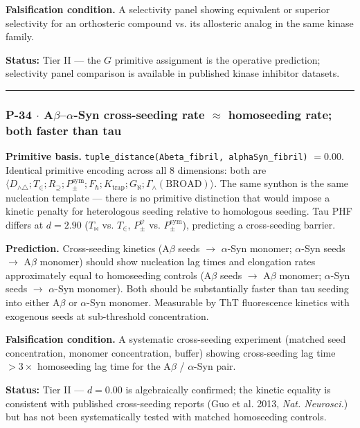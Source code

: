 \documentclass[12pt,a4paper]{article}
\begin{document}
\textbf{Falsification condition.} A selectivity panel showing equivalent or superior selectivity for an orthosteric compound vs. its allosteric analog in the same kinase family.

\textbf{Status:} Tier II --- the $G$ primitive assignment is the operative prediction; selectivity panel comparison is available in published kinase inhibitor datasets.

\begin{center}
\rule{0.5\textwidth}{0.4pt}
\end{center}

\subsubsection{P-34 $\cdot$ A$\beta$--$\alpha$-Syn cross-seeding rate $\approx$ homoseeding rate; both faster than tau}

\textbf{Primitive basis.} \texttt{tuple\_distance(Abeta\_fibril, alphaSyn\_fibril)} $= 0.00$. Identical primitive encoding across all 8 dimensions: both are $\langle D_{\wedge\triangle}; T_\in; R_\supseteq; P_\pm^\text{sym}; F_\hbar; K_\text{trap}; G_\aleph; \Gamma_\wedge(\text{BROAD})\rangle$. The same synthon is the same nucleation template --- there is no primitive distinction that would impose a kinetic penalty for heterologous seeding relative to homologous seeding. Tau PHF differs at $d = 2.90$ ($T_\bowtie$ vs. $T_\in$, $P_\pm^\psi$ vs. $P_\pm^\text{sym}$), predicting a cross-seeding barrier.

\textbf{Prediction.} Cross-seeding kinetics (A$\beta$ seeds $\rightarrow$ $\alpha$-Syn monomer; $\alpha$-Syn seeds $\rightarrow$ A$\beta$ monomer) should show nucleation lag times and elongation rates approximately equal to homoseeding controls (A$\beta$ seeds $\rightarrow$ A$\beta$ monomer; $\alpha$-Syn seeds $\rightarrow$ $\alpha$-Syn monomer). Both should be substantially faster than tau seeding into either A$\beta$ or $\alpha$-Syn monomer. Measurable by ThT fluorescence kinetics with exogenous seeds at sub-threshold concentration.

\textbf{Falsification condition.} A systematic cross-seeding experiment (matched seed concentration, monomer concentration, buffer) showing cross-seeding lag time $> 3\times$ homoseeding lag time for the A$\beta$ / $\alpha$-Syn pair.

\textbf{Status:} Tier II --- $d = 0.00$ is algebraically confirmed; the kinetic equality is consistent with published cross-seeding reports (Guo et al. 2013, \emph{Nat. Neurosci.}) but has not been systematically tested with matched homoseeding controls.
\end{document}
